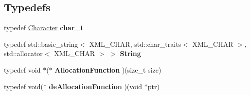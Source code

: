 \subsection*{Typedefs}
\begin{DoxyCompactItemize}
\item 
\hypertarget{namespacephys_1_1xml_afc87705cd1c2917d87b879715a2d8f6e}{
typedef \hyperlink{namespacephys_a3098bae5b0a3cd16eec331f766cc562b}{Character} {\bfseries char\_\-t}}
\label{d9/d27/namespacephys_1_1xml_afc87705cd1c2917d87b879715a2d8f6e}

\item 
\hypertarget{namespacephys_1_1xml_a4d8ca7638328d16d303e5a4c849f4704}{
typedef std::basic\_\-string$<$ XML\_\-CHAR, std::char\_\-traits$<$ XML\_\-CHAR $>$, std::allocator$<$ XML\_\-CHAR $>$ $>$ {\bfseries String}}
\label{d9/d27/namespacephys_1_1xml_a4d8ca7638328d16d303e5a4c849f4704}

\item 
\hypertarget{namespacephys_1_1xml_a07e4865c24e45f8e5831e4eebadb1353}{
typedef void $\ast$($\ast$ {\bfseries AllocationFunction} )(size\_\-t size)}
\label{d9/d27/namespacephys_1_1xml_a07e4865c24e45f8e5831e4eebadb1353}

\item 
\hypertarget{namespacephys_1_1xml_a0006efe9740ffdcfff4e03cee525f1ff}{
typedef void($\ast$ {\bfseries deAllocationFunction} )(void $\ast$ptr)}
\label{d9/d27/namespacephys_1_1xml_a0006efe9740ffdcfff4e03cee525f1ff}

\end{DoxyCompactItemize}
